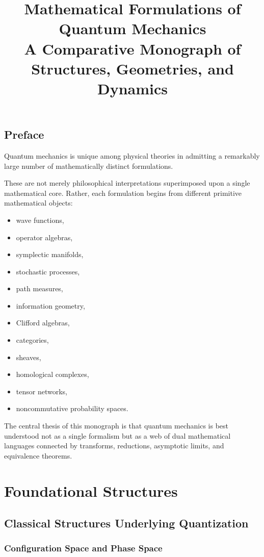 \documentclass[11pt]{book}
\title{Mathematical Formulations of Quantum Mechanics\\
A Comparative Monograph of Structures, Geometries, and Dynamics}
\author{}
\date{}
\begin{document}
\maketitle
\tableofcontents

\chapter*{Preface}

Quantum mechanics is unique among physical theories in admitting a remarkably large number of mathematically distinct formulations.

These are not merely philosophical interpretations superimposed upon a single mathematical core. Rather, each formulation begins from different primitive mathematical objects:

\begin{itemize}
\item wave functions,
\item operator algebras,
\item symplectic manifolds,
\item stochastic processes,
\item path measures,
\item information geometry,
\item Clifford algebras,
\item categories,
\item sheaves,
\item homological complexes,
\item tensor networks,
\item noncommutative probability spaces.
\end{itemize}

The central thesis of this monograph is that quantum mechanics is best understood not as a single formalism but as a web of dual mathematical languages connected by transforms, reductions, asymptotic limits, and equivalence theorems.

\part{Foundational Structures}

\chapter{Classical Structures Underlying Quantization}

\section{Configuration Space and Phase Space}
\end{document}
